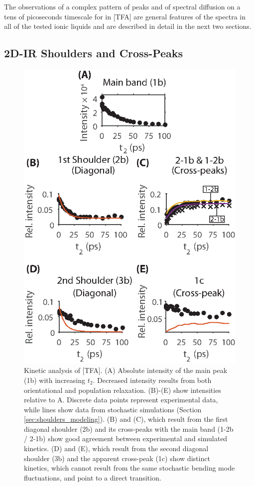The observations of a complex pattern of peaks and of spectral diffusion on a tens of picoseconds timescale for  in \ce{[Im_{4,1}]}[TFA]  are general features of the spectra in all of the tested ionic liquids and are described in detail in the next two sections.

\subsection{2D-IR Shoulders and Cross-Peaks}
\label{sec:shoulders}
\begin{figure}
	\includegraphics[scale = 1]{./anions/fig6.eps}
	\caption[Bending mode kinetics]{\label{fig:shoulder kinetics}Kinetic analysis of \ce{[Im_{4,1}]}[TFA]. (A) Absolute intensity of the main peak (1b) with increasing $t_2$. Decreased intensity results from both orientational and population relaxation. (B)-(E) show intensities relative to A. Discrete data points represent experimental data, while lines show data from stochastic simulations (Section \ref{sec:shoulders_modeling}). (B) and (C), which result from the first diagonal shoulder (2b) and its cross-peaks with the main band (1-2b / 2-1b) show good agreement between experimental and simulated kinetics. (D) and (E), which result from the second diagonal shoulder (3b) and the apparent cross-peak (1c) show distinct kinetics, which cannot result from the same stochastic bending mode fluctuations, and point to a direct transition.}
\end{figure}
